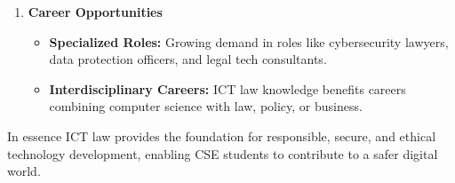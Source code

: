 \begin{enumerate}[itemsep=1em, leftmargin=1em]
   \item \textbf{Career Opportunities}
   \begin{itemize}[itemsep=0.5em]
      \item	\textbf{Specialized Roles:} Growing demand in roles like cybersecurity lawyers, data protection officers, and legal tech consultants.
      \item	\textbf{Interdisciplinary Careers:} ICT law knowledge benefits careers combining computer science with law, policy, or business.
   \end{itemize}
\end{enumerate}

In essence ICT law provides the foundation for responsible, secure, and ethical technology development, enabling CSE students to contribute to a safer digital world.
